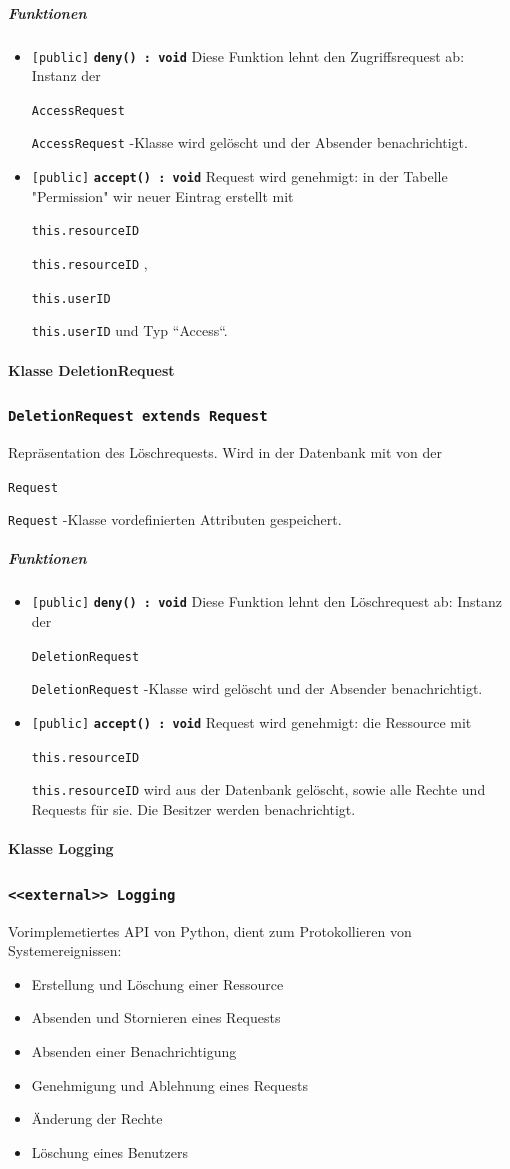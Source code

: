 \documentclass[parskip=full,11pt]{scrartcl}
\makeatletter
\newcommand{\lstInline}[2][,]{%
	\begingroup%
	\lstset{#1}%
	\begin{lrbox}{\mylisting}\lstinline!#2!\end{lrbox}%
	\setlength{\@tempdima}{\linegoal}%
	\ifdim\wd\mylisting>\@tempdima\hfill\\\fi%
	\lstinline!#2!%
	\endgroup%
}
\newcommand{\class}[1]{\subsubsection*{\lstinline[basicstyle=\ttfamily\large]{#1}}}
\newcommand{\mtd}[5]{\lstinline{[#4]} \textbf{\lstinline{#1(#3) : #2}} \newline #5}
\newcommand{\inlinecode}[1]{\lstInline[breaklines=true]{#1}}
\makeatother
\begin{document}
\subparagraph*{Funktionen}  %
\begin{itemize}
	\item \mtd{deny}{void}{}{public}{
	Diese Funktion lehnt den Zugriffsrequest ab: Instanz der \inlinecode{AccessRequest}-Klasse wird gelöscht und der Absender benachrichtigt.
	}
	
	\item \mtd{accept}{void}{}{public}{
	Request wird genehmigt: in der Tabelle "Permission" wir neuer Eintrag erstellt mit \inlinecode{this.resourceID}, \inlinecode{this.userID} und Typ ``Access``.
	}
\end{itemize}

  \paragraph*{Klasse DeletionRequest}
  
 \class{DeletionRequest extends Request}
Repräsentation des Löschrequests. Wird in der Datenbank mit von der \inlinecode{Request}-Klasse vordefinierten Attributen gespeichert.
 
\subparagraph*{Funktionen}  %
\begin{itemize}
	\item \mtd{deny}{void}{}{public}{
	Diese Funktion lehnt den Löschrequest ab: Instanz der \inlinecode{DeletionRequest}-Klasse wird gelöscht und der Absender benachrichtigt.
	}
	
	\item \mtd{accept}{void}{}{public}{
	Request wird genehmigt: die Ressource mit \inlinecode{this.resourceID} wird aus der Datenbank gelöscht, sowie alle Rechte und Requests für sie. Die Besitzer werden benachrichtigt.
	}
\end{itemize}
\newpage
  \paragraph*{Klasse Logging}
 \class{<<external>> Logging}
Vorimplemetiertes API von Python, dient zum Protokollieren von Systemereignissen:
\begin{itemize}
	\item Erstellung und Löschung einer Ressource
	\item Absenden und Stornieren eines Requests
	\item Absenden einer Benachrichtigung
	\item Genehmigung und Ablehnung eines Requests
	\item Änderung der Rechte
	\item Löschung eines Benutzers 
\end{itemize}
 
\end{document}
